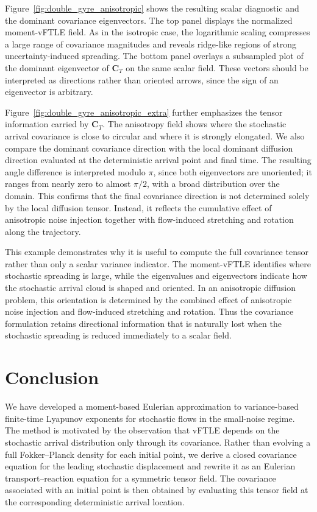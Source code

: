 \documentclass[a4paper,11pt]{article}
\numberwithin{equation}{section}
\theoremstyle{plain}
\theoremstyle{definition}
\theoremstyle{remark}
\newcommand{\bC}{\mathbf{C}}
\begin{document}
Figure~\ref{fig:double_gyre_anisotropic} shows the resulting scalar diagnostic and the dominant covariance eigenvectors.  The top panel displays the normalized moment-vFTLE field.  As in the isotropic case, the logarithmic scaling compresses a large range of covariance magnitudes and reveals ridge-like regions of strong uncertainty-induced spreading.  The bottom panel overlays a subsampled plot of the dominant eigenvector of \(\bC_T\) on the same scalar field.  These vectors should be interpreted as directions rather than oriented arrows, since the sign of an eigenvector is arbitrary.

Figure~\ref{fig:double_gyre_anisotropic_extra} further emphasizes the tensor information carried by \(\bC_T\).  The anisotropy field shows where the stochastic arrival covariance is close to circular and where it is strongly elongated.  We also compare the dominant covariance direction with the local dominant diffusion direction evaluated at the deterministic arrival point and final time.  The resulting angle difference is interpreted modulo \(\pi\), since both eigenvectors are unoriented; it ranges from nearly zero to almost \(\pi/2\), with a broad distribution over the domain.  This confirms that the final covariance direction is not determined solely by the local diffusion tensor.  Instead, it reflects the cumulative effect of anisotropic noise injection together with flow-induced stretching and rotation along the trajectory.

This example demonstrates why it is useful to compute the full covariance tensor rather than only a scalar variance indicator.  The moment-vFTLE identifies where stochastic spreading is large, while the eigenvalues and eigenvectors indicate how the stochastic arrival cloud is shaped and oriented.  In an anisotropic diffusion problem, this orientation is determined by the combined effect of anisotropic noise injection and flow-induced stretching and rotation.  Thus the covariance formulation retains directional information that is naturally lost when the stochastic spreading is reduced immediately to a scalar field.


\section{Conclusion}
\label{sec:conclusion}

We have developed a moment-based Eulerian approximation to variance-based finite-time Lyapunov exponents for stochastic flows in the small-noise regime.  The method is motivated by the observation that vFTLE depends on the stochastic arrival distribution only through its covariance.  Rather than evolving a full Fokker--Planck density for each initial point, we derive a closed covariance equation for the leading stochastic displacement and rewrite it as an Eulerian transport--reaction equation for a symmetric tensor field.  The covariance associated with an initial point is then obtained by evaluating this tensor field at the corresponding deterministic arrival location.
\end{document}
